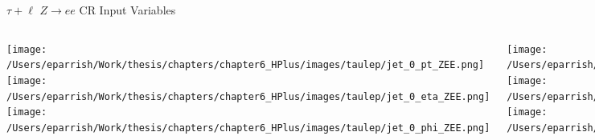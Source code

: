 \documentclass[aspectratio=169,xcolor=table]{beamer}
\begin{document}
    \begin{frame}[t]{$\tau+\ell$ $Z \rightarrow ee$ CR Input Variables}
      \begin{columns}[t]
          \texttt{[image: /Users/eparrish/Work/thesis/chapters/chapter6\_HPlus/images/taulep/jet\_0\_pt\_ZEE.png]}
          \texttt{[image: /Users/eparrish/Work/thesis/chapters/chapter6\_HPlus/images/taulep/jet\_0\_eta\_ZEE.png]}
          \texttt{[image: /Users/eparrish/Work/thesis/chapters/chapter6\_HPlus/images/taulep/jet\_0\_phi\_ZEE.png]}

          \texttt{[image: /Users/eparrish/Work/thesis/chapters/chapter6\_HPlus/images/taulep/lep\_0\_pt\_ZEE.png]}
          \texttt{[image: /Users/eparrish/Work/thesis/chapters/chapter6\_HPlus/images/taulep/lep\_0\_eta\_ZEE.png]}
          \texttt{[image: /Users/eparrish/Work/thesis/chapters/chapter6\_HPlus/images/taulep/lep\_0\_phi\_ZEE.png]}

          \texttt{[image: /Users/eparrish/Work/thesis/chapters/chapter6\_HPlus/images/taulep/el\_0\_pt\_ZEE.png]}
          \texttt{[image: /Users/eparrish/Work/thesis/chapters/chapter6\_HPlus/images/taulep/el\_0\_eta\_ZEE.png]}
          \texttt{[image: /Users/eparrish/Work/thesis/chapters/chapter6\_HPlus/images/taulep/el\_0\_phi\_ZEE.png]}

          \texttt{[image: /Users/eparrish/Work/thesis/chapters/chapter6\_HPlus/images/taulep/mu\_0\_pt\_ZEE.png]}
          \texttt{[image: /Users/eparrish/Work/thesis/chapters/chapter6\_HPlus/images/taulep/mu\_0\_eta\_ZEE.png]}
          \texttt{[image: /Users/eparrish/Work/thesis/chapters/chapter6\_HPlus/images/taulep/mu\_0\_phi\_ZEE.png]}

      \end{columns}
    \end{frame}
\end{document}
